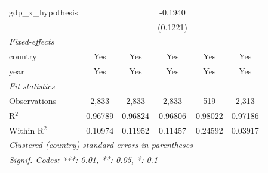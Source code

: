 \begin{tabular}{lccccc}
   gdp\_x\_hypothesis    &                 &                 & -0.1940         &                 &   \\   
                         &                 &                 & (0.1221)        &                 &   \\   
   \midrule
   \emph{Fixed-effects}\\
   country               & Yes             & Yes             & Yes             & Yes             & Yes\\  
   year                  & Yes             & Yes             & Yes             & Yes             & Yes\\  
   \midrule
   \emph{Fit statistics}\\
   Observations          & 2,833           & 2,833           & 2,833           & 519             & 2,313\\  
   R$^2$                 & 0.96789         & 0.96824         & 0.96806         & 0.98022         & 0.97186\\  
   Within R$^2$          & 0.10974         & 0.11952         & 0.11457         & 0.24592         & 0.03917\\  
   \midrule \midrule
   \multicolumn{6}{l}{\emph{Clustered (country) standard-errors in parentheses}}\\
   \multicolumn{6}{l}{\emph{Signif. Codes: ***: 0.01, **: 0.05, *: 0.1}}\\
\end{tabular}
\par\endgroup


